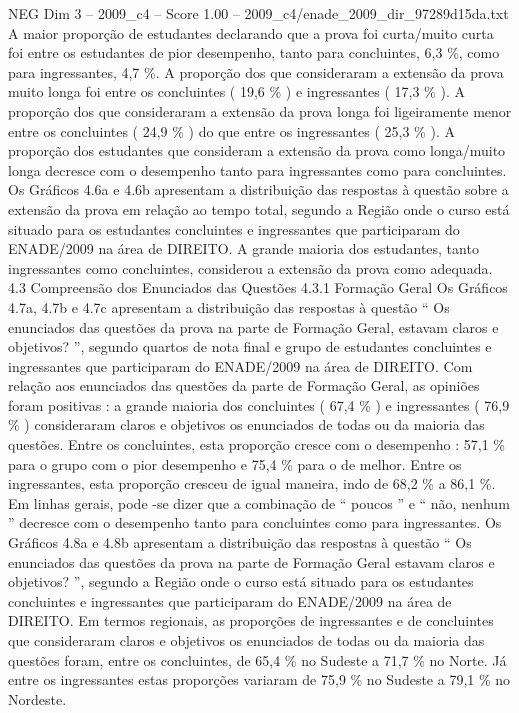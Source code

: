 \begin{textsample}{NEG Dim 3 – 2009\_c4 – Score 1.00 – 2009\_c4/enade\_2009\_dir\_97289d15da.txt}
A maior proporção de estudantes declarando que a prova foi curta/muito curta foi entre os estudantes de pior desempenho, tanto para concluintes, 6,3 \%, como para ingressantes, 4,7 \%.
A proporção dos que consideraram a extensão da prova muito longa foi entre os concluintes ( 19,6 \% ) e ingressantes ( 17,3 \% ).
A proporção dos que consideraram a extensão da prova longa foi ligeiramente menor entre os concluintes ( 24,9 \% ) do que entre os ingressantes ( 25,3 \% ).
A proporção dos estudantes que consideram a extensão da prova como longa/muito longa decresce com o desempenho tanto para ingressantes como para concluintes.
Os Gráficos 4.6a e 4.6b apresentam a distribuição das respostas à questão sobre a extensão da prova em relação ao tempo total, segundo a Região onde o curso está situado para os estudantes concluintes e ingressantes que participaram do ENADE/2009 na área de DIREITO.
A grande maioria dos estudantes, tanto ingressantes como concluintes, considerou a extensão da prova como adequada. 4.3 Compreensão dos Enunciados das Questões 4.3.1 Formação Geral Os Gráficos 4.7a, 4.7b e 4.7c apresentam a distribuição das respostas à questão “ Os enunciados das questões da prova na parte de Formação Geral, estavam claros e objetivos? ”, segundo quartos de nota final e grupo de estudantes concluintes e ingressantes que participaram do ENADE/2009 na área de DIREITO.
Com relação aos enunciados das questões da parte de Formação Geral, as opiniões foram positivas : a grande maioria dos concluintes ( 67,4 \% ) e ingressantes ( 76,9 \% ) consideraram claros e objetivos os enunciados de todas ou da maioria das questões.
Entre os concluintes, esta proporção cresce com o desempenho : 57,1 \% para o grupo com o pior desempenho e 75,4 \% para o de melhor.
Entre os ingressantes, esta proporção cresceu de igual maneira, indo de 68,2 \% a 86,1 \%.
Em linhas gerais, pode -se dizer que a combinação de “ poucos ” e “ não, nenhum ” decresce com o desempenho tanto para concluintes como para ingressantes.
Os Gráficos 4.8a e 4.8b apresentam a distribuição das respostas à questão “ Os enunciados das questões da prova na parte de Formação Geral estavam claros e objetivos? ”, segundo a Região onde o curso está situado para os estudantes concluintes e ingressantes que participaram do ENADE/2009 na área de DIREITO.
Em termos regionais, as proporções de ingressantes e de concluintes que consideraram claros e objetivos os enunciados de todas ou da maioria das questões foram, entre os concluintes, de 65,4 \% no Sudeste a 71,7 \% no Norte.
Já entre os ingressantes estas proporções variaram de 75,9 \% no Sudeste a 79,1 \% no Nordeste.

\end{textsample}
